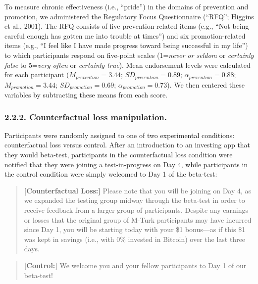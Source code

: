 \documentclass[man,floatsintext]{apa6}
\begin{document}
To measure chronic effectiveness (i.e., \enquote{pride}) in the domains of prevention and promotion, we administered the Regulatory Focus Questionnaire (``RFQ''; Higgins et al., 2001). The RFQ consists of five prevention-related items (e.g., \enquote{Not being careful enough has gotten me into trouble at times}) and six promotion-related items (e.g., \enquote{I feel like I have made progress toward being successful in my life}) to which participants respond on five-point scales (1=\emph{never or seldom} or \emph{certainly false} to 5=\emph{very often} or \emph{certainly true}). Mean endorsement levels were calculated for each participant (\(M_{prevention}=3.44\); \(SD_{prevention}=0.89\); \(\alpha_{prevention}=0.88\); \(M_{promotion}=3.44\); \(SD_{promotion}=0.69\); \(\alpha_{promotion}=0.73\)). We then centered these variables by subtracting these means from each score.

\hypertarget{counterfactual-loss-manipulation.}{%
\subsubsection{2.2.2. Counterfactual loss manipulation.}\label{counterfactual-loss-manipulation.}}

Participants were randomly assigned to one of two experimental conditions: counterfactual loss versus control. After an introduction to an investing app that they would beta-test, participants in the counterfactual loss condition were notified that they were joining a test-in-progress on Day 4, while participants in the control condition were simply welcomed to Day 1 of the beta-test:

\begin{quote}
\textbf{{[}Counterfactual Loss:{]}} Please note that you will be joining on Day 4, as we expanded the testing group midway through the beta-test in order to receive feedback from a larger group of participants. Despite any earnings or losses that the original group of M-Turk participants may have incurred since Day 1, you will be starting today with your \$1 bonus---as if this \$1 was kept in savings (i.e., with 0\% invested in Bitcoin) over the last three days.
\end{quote}

\begin{quote}
\textbf{{[}Control:{]}} We welcome you and your fellow participants to Day 1 of our beta-test!
\end{quote}
\end{document}
